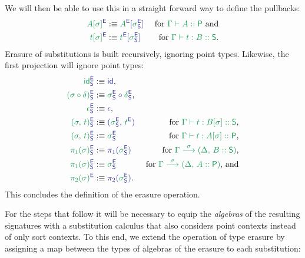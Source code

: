\begin{defn}
\begin{equation*}
\end{equation*}
We will then be able to use this in a straight forward way to define the pullbacks:
\begin{align*}
\tqm{\grm{A[\sigma]}^\EE}
  &:\equiv \tqm{\grm{A}^\EE[\grm{\sigma}^\EE_\Sc]}
  & \text{ for \grm{\Gamma \vdash A :: \Pc} and} \\
\tqm{\grm{t[\sigma]}^\EE}
  &:\equiv \tqm{\grm{t}^\EE[\grm{\sigma}^\EE_\Sc]}
  & \text{ for \grm{\Gamma \vdash t : B :: \Sc}.}
\end{align*}
Erasure of substitutions is built recursively, ignoring point types.
Likewise, the first projection will ignore point types:
\begin{align*}\label{eq:red-e-sub}
\tqm{\grm{\id}^\EE_\Sc}
  &:\equiv \tqm{\id} \text{,}
  & \\
\tqm{\grm{(\sigma \circ \delta)}^\EE_\Sc}
  &:\equiv \tqm{\grm{\sigma}^\EE_\Sc \circ \grm{\delta}^\EE_\Sc} \text{,}
  & \\
\tqm{\grm{\epsilon}^\EE_\Sc}
  &:\equiv \tqm{\epsilon} \text{,}
  & \\
\tqm{\grm{(\sigma,\, t)}^\EE_\Sc}
  &:\equiv \tqm{(\grm{\sigma}^\EE_\Sc,\, \grm{t}^\EE)}
  & \text{ for \grm{\Gamma \vdash t : B[\sigma] :: \Sc},} \\
\tqm{\grm{(\sigma,\, t)}^\EE_\Sc}
  &:\equiv \tqm{\grm{\sigma}^\EE_\Sc}
  & \text{ for \grm{\Gamma \vdash t : A[\sigma] :: \Pc},} \\
\tqm{\grm{\pi_1(\sigma)}^\EE_\Sc}
  &:\equiv \tqm{\pi_1(\grm{\sigma}^\EE_\Sc)}
  & \text{ for \grm{\IISub{\sigma}{\Gamma}{(\Delta,\, B :: \Sc)}},} \\
\tqm{\grm{\pi_1(\sigma)}^\EE_\Sc}
  &:\equiv \tqm{\grm{\sigma}^\EE_\Sc}
  & \text{ for \grm{\IISub{\sigma}{\Gamma}{(\Delta,\, A :: \Pc)}}, and} \\
\tqm{\grm{\pi_2(\sigma)}^\EE}
  &:\equiv \tqm{\pi_2(\grm{\sigma}^\EE_\Sc)} \text{.}
  &
\end{align*} %
This concludes the definition of the erasure operation.
\end{defn} %

For the steps that follow it will be necessary to equip the \emph{algebras}
of the resulting signatures with a substitution calculus that also considers
point contexts instead of only sort contexts.
To this end, we extend the operation of type erasure by assigning a map between
the types of algebras of the erasure to each substitution:

